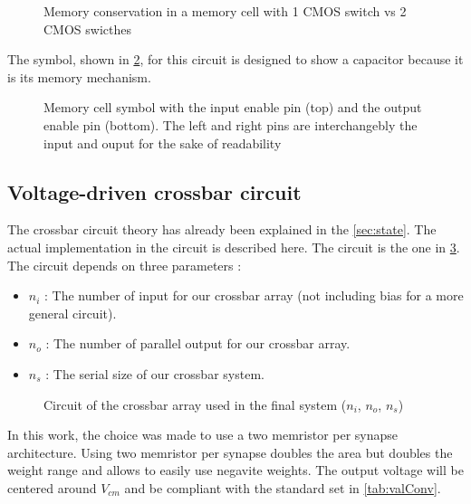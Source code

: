 \begin{figure}[b]
  \centering
  
  \caption{Memory conservation in a memory cell with 1 \ac{CMOS} switch vs 2 \ac{CMOS} swicthes}
  \label{fig:memcellLoss}
\end{figure}

The symbol, shown in \cref{sym:memcell}, for this circuit is designed to show a capacitor because it is its memory mechanism.

\begin{figure}[t]
  \centering
  
  \caption{Memory cell symbol with the input enable pin (top) and the output enable pin (bottom). The left and right pins are interchangebly the input and ouput for the sake of readability}
  \label{sym:memcell}
\end{figure}

\subsection{Voltage-driven crossbar circuit}\label{subsec:xbarCircuit}

The crossbar circuit theory has already been explained in the \cref{sec:state}. The actual implementation in the circuit is described here. The circuit is the one in \cref{circt:xbar}. The circuit depends on three parameters :

\begin{itemize}
  \item $n_i$ : The number of input for our crossbar array (not including bias for a more general circuit).
  \item $n_o$ : The number of parallel output for our crossbar array.
  \item $n_s$ : The serial size of our crossbar system.
\end{itemize}

\begin{figure}[b]
  \centering
  
  \caption{Circuit of the crossbar array used in the final system ($n_i$, $n_o$, $n_s$)}
  \label{circt:xbar}
\end{figure}

In this work, the choice was made to use a two memristor per synapse architecture. Using two memristor per synapse doubles the area but doubles the weight range \cite{doubleMem} and allows to easily use negavite weights. The output voltage will be centered around $V_{cm}$ and be compliant with the standard set in \cref{tab:valConv}.

